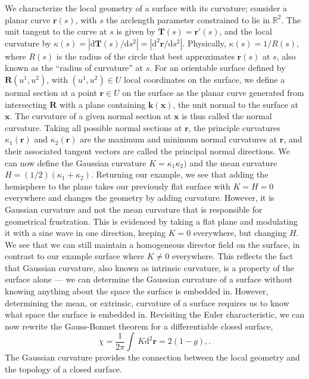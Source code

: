 We characterize the local geometry of a surface with its curvature; consider a planar curve $\mathbf{r}(s)$, with $s$ the arclength parameter constrained to lie in $\mathbb{R}^2$.
The unit tangent to the curve at $s$ is given by $\mathbf{T}(s) = \mathbf{r}'(s)$, and the local curvature by $\kappa(s) = |\textrm{d} \mathbf{T}(s)/\textrm{d}s^2| = | \textrm{d}^2\mathbf{r}/\textrm{d}s^2 |$.
Physically, $\kappa(s) = 1/R(s)$, where $R(s)$ is the radius of the circle that best approximates $\mathbf{r}(s)$ at $s$, also known as the ``radius of curvature'' at $s$.
For an orientable surface defined by $\mathbf{R}(u^1,u^2)$, with $(u^1,u^2) \in U$ local coordinates on the surface, we define a normal section at a point $\mathbf{r} \in U$ on the surface as the planar curve generated from intersecting $\mathbf{R}$ with a plane containing $\mathbf{k}(\mathbf{x})$, the unit normal to the surface at $\mathbf{x}$.
The curvature of a given normal section at $\mathbf{x}$ is thus called the normal curvature.
Taking all possible normal sections at $\mathbf{r}$, the principle curvatures $\kappa_1 (\mathbf{r})$ and $\kappa_2(\mathbf{r})$ are the maximum and minimum normal curvatures at $\mathbf{r}$, and their associated tangent vectors are called the principal normal directions.
We can now define the Gaussian curvature $K  = \kappa_1 \kappa_2)$ and the mean curvature $H = (1/2) (\kappa_1+\kappa_2)$.
Returning our example, we see that adding the hemisphere to the plane takes our previously flat surface with $K = H = 0$ everywhere and changes the geometry by adding curvature.
However, it is Gaussian curvature and not the mean curvature that is responsible for geometrical frustration.
This is evidenced by taking a flat plane and modulating it with a sine wave in one direction, keeping $K=0$ everywhere, but changing $H$.
We see that we can still maintain a homogeneous director field on the surface, in contrast to our example surface where $K \neq 0$ everywhere.
This reflects the fact that Gaussian curvature, also known as intrinsic curvature, is a property of the surface alone --- we can determine the Gaussian curvature of a surface without knowing anything about the space the surface is embedded in.
However, determining the mean, or extrinsic, curvature of a surface requires us to know what space the surface is embedded in.
Revisiting the Euler characteristic, we can now rewrite the Gauss-Bonnet theorem for a differentiable closed surface,
\begin{equation}
  \chi = \frac{1}{2 \pi} \int \, K \textrm{d}^2\mathbf{r} = 2(1-g),\label{e:1-GB2}.
\end{equation}
The Gaussian curvature provides the connection between the local geometry and the topology of a closed surface.

